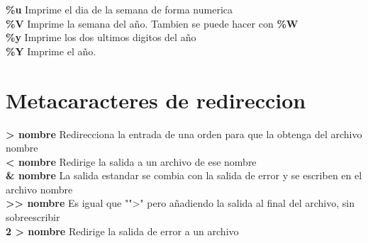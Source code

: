 \documentclass[11pt]{article}
\begin{document}
\hspace{2cm} \textbf{\%u} \hspace{2cm} Imprime el dia de la semana de forma numerica\\

\hspace{2cm} \textbf{\%V} \hspace{2cm} Imprime la semana del a\~no. Tambien se puede hacer con \textbf{\%W}\\


\hspace{2cm} \textbf{\%y}\hspace{2cm} Imprime los dos ultimos digitos del a\~no\\

\hspace{2cm} \textbf{\%Y}\hspace{2cm} Imprime el a\~no.

\vspace{1cm}



\section{Metacaracteres de redireccion}
 
\textbf{ \textgreater \hspace{.03cm} nombre} \hspace{2cm} Redirecciona la entrada de una orden para que la obtenga del archivo nombre\\

\textbf{ \textless \hspace{.03cm} nombre} \hspace{2cm} Redirige la salida a un archivo de ese nombre\\

\textbf{\& nombre} \hspace{2cm} La salida estandar se combia con la salida de error y se escriben en el archivo nombre \\

\textbf{\textgreater \textgreater \hspace{.03cm} nombre} \hspace{2cm} Es igual que "">" pero añadiendo la salida al final del archivo, sin sobreescribir\\

\textbf{2 \textgreater \hspace{.03cm} nombre} \hspace{2cm} Redirige la salida de error a un archivo \\
\end{document}
